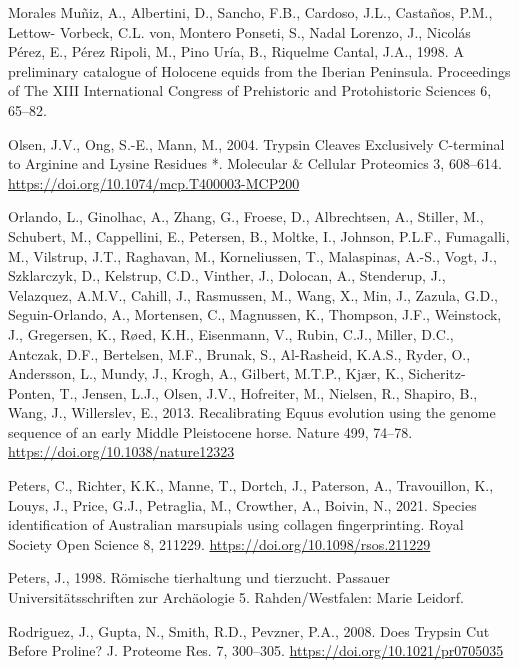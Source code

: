 \documentclass[preprint, 3p, authoryear]{elsarticle} %
\newlength{\cslhangindent}
\newlength{\cslentryspacingunit} %
\newenvironment{CSLReferences}[2] %
 {%
  \setlength{\parindent}{0pt}
  \ifodd #1
  \let\oldpar\par
  \def\par{\hangindent=\cslhangindent\oldpar}
  \fi
  \setlength{\parskip}{#2\cslentryspacingunit}
 }%
 {}
\begin{document}
\begin{CSLReferences}{1}{0}
\leavevmode{}%
Morales Muñiz, A., Albertini, D., Sancho, F.B., Cardoso, J.L., Castaños, P.M., Lettow- Vorbeck, C.L. von, Montero Ponseti, S., Nadal Lorenzo, J., Nicolás Pérez, E., Pérez Ripoli, M., Pino Uría, B., Riquelme Cantal, J.A., 1998. A preliminary catalogue of {Holocene} equids from the {Iberian Peninsula}. Proceedings of The XIII International Congress of Prehistoric and Protohistoric Sciences 6, 65--82.

\leavevmode{}%
Olsen, J.V., Ong, S.-E., Mann, M., 2004. Trypsin {Cleaves Exclusively C-terminal} to {Arginine} and {Lysine Residues} *. Molecular \& Cellular Proteomics 3, 608--614. \url{https://doi.org/10.1074/mcp.T400003-MCP200}

\leavevmode{}%
Orlando, L., Ginolhac, A., Zhang, G., Froese, D., Albrechtsen, A., Stiller, M., Schubert, M., Cappellini, E., Petersen, B., Moltke, I., Johnson, P.L.F., Fumagalli, M., Vilstrup, J.T., Raghavan, M., Korneliussen, T., Malaspinas, A.-S., Vogt, J., Szklarczyk, D., Kelstrup, C.D., Vinther, J., Dolocan, A., Stenderup, J., Velazquez, A.M.V., Cahill, J., Rasmussen, M., Wang, X., Min, J., Zazula, G.D., Seguin-Orlando, A., Mortensen, C., Magnussen, K., Thompson, J.F., Weinstock, J., Gregersen, K., Røed, K.H., Eisenmann, V., Rubin, C.J., Miller, D.C., Antczak, D.F., Bertelsen, M.F., Brunak, S., Al-Rasheid, K.A.S., Ryder, O., Andersson, L., Mundy, J., Krogh, A., Gilbert, M.T.P., Kjær, K., Sicheritz-Ponten, T., Jensen, L.J., Olsen, J.V., Hofreiter, M., Nielsen, R., Shapiro, B., Wang, J., Willerslev, E., 2013. Recalibrating {Equus} evolution using the genome sequence of an early {Middle Pleistocene} horse. Nature 499, 74--78. \url{https://doi.org/10.1038/nature12323}

\leavevmode{}%
Peters, C., Richter, K.K., Manne, T., Dortch, J., Paterson, A., Travouillon, K., Louys, J., Price, G.J., Petraglia, M., Crowther, A., Boivin, N., 2021. Species identification of {Australian} marsupials using collagen fingerprinting. Royal Society Open Science 8, 211229. \url{https://doi.org/10.1098/rsos.211229}

\leavevmode{}%
Peters, J., 1998. Römische tierhaltung und tierzucht. {Passauer Universitätsschriften} zur {Archäologie} 5. Rahden/Westfalen: Marie Leidorf.

\leavevmode{}%
Rodriguez, J., Gupta, N., Smith, R.D., Pevzner, P.A., 2008. Does {Trypsin Cut Before Proline}? J. Proteome Res. 7, 300--305. \url{https://doi.org/10.1021/pr0705035}


\end{CSLReferences}
\end{document}
